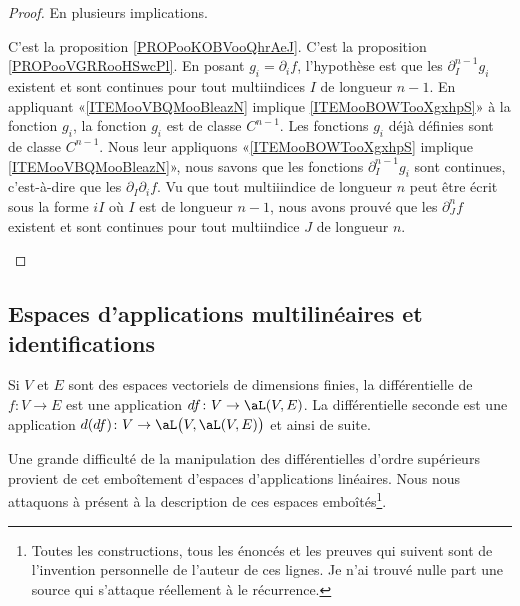 \begin{proof}
	En plusieurs implications.
	\begin{subproof}
		C'est la proposition \ref{PROPooKOBVooQhrAeJ}.
		C'est la proposition \ref{PROPooVGRRooHSwcPl}.
		En posant \( g_i=\partial_if\), l'hypothèse est que les \( \partial^{n-1}_Ig_i\) existent et sont continues pour tout multiindices \( I\) de longueur \( n-1\). En appliquant «\ref{ITEMooVBQMooBleazN} implique \ref{ITEMooBOWTooXgxhpS}» à la fonction \( g_i\), la fonction \( g_i\) est de classe \( C^{n-1}\).
		Les fonctions \( g_i\) déjà définies sont de classe \( C^{n-1}\). Nous leur appliquons «\ref{ITEMooBOWTooXgxhpS} implique \ref{ITEMooVBQMooBleazN}», nous savons que les fonctions \( \partial^{n-1}_Ig_i\) sont continues, c'est-à-dire que les \( \partial_I\partial_if\). Vu que tout multiiindice de longueur \( n\) peut être écrit sous la forme \( iI\) où \( I\) est de longueur \( n-1\), nous avons prouvé que les \( \partial^n_Jf\) existent et sont continues pour tout multiindice \( J\) de longueur \( n\).
	\end{subproof}
\end{proof}

\subsection{Espaces d'applications multilinéaires et identifications}

Si \( V\) et \( E\) sont des espaces vectoriels de dimensions finies, la différentielle de \( f\colon V\to E\) est une application \( df\colon V\to \aL(V,E)\). La différentielle seconde est une application \( d(df)\colon V\to \aL\big( V,\aL(V,E) \big)\) et ainsi de suite.

Une grande difficulté de la manipulation des différentielles d'ordre supérieurs provient de cet emboîtement d'espaces d'applications linéaires. Nous nous attaquons à présent à la description de ces espaces emboîtés\footnote{Toutes les constructions, tous les énoncés et les preuves qui suivent sont de l'invention personnelle de l'auteur de ces lignes. Je n'ai trouvé nulle part une source qui s'attaque réellement à le récurrence.}.

